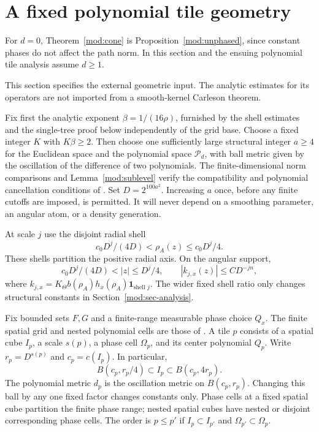 \documentclass[11pt]{article}
\numberwithin{equation}{section}
\theoremstyle{remark}
\theoremstyle{definition}
\newcommand{\PP}{\mathcal P}
\begin{document}
\section{A fixed polynomial tile geometry}\label{mod:sec-geometry}
For $d=0$, Theorem~\ref{mod:cone} is Proposition~\ref{mod:unphased}, since constant phases do not affect the path norm. In this section and the ensuing polynomial tile analysis assume $d\ge1$.

This section specifies the external geometric input. The analytic
estimates for its operators are not imported from a smooth-kernel
Carleson theorem.

Fix first the analytic exponent $\beta=1/(16\rho)$, furnished by
the shell estimates and the single-tree proof below independently of
the grid base. Choose a fixed integer $K$ with $K\beta\ge2$.
Then choose one sufficiently large structural integer $a\ge4$ for the
Euclidean space and the polynomial space $\PP_d$, with ball metric given
by the oscillation of the difference of two polynomials. The
finite-dimensional norm comparisons and Lemma~\ref{mod:sublevel} verify
the compatibility and polynomial cancellation conditions of
\cite{BDJST}. Set $D=2^{100a^2}$. Increasing $a$ once, before any finite
cutoffs are imposed, is permitted. It will never depend on a smoothing
parameter, an angular atom, or a density generation.

At scale $j$ use the disjoint radial shell
\begin{equation}\label{mod:raw-shell}
 c_0D^j/(4D)<\rho_A(z)\le c_0D^j/4.
\end{equation}
These shells partition the positive radial axis. On the angular support,
\[
 c_0D^j/(4D)<|z|\le D^j/4,
 \qquad |k_{j,x}(z)|\le C D^{-jn},
\]
where $k_{j,x}=K_\Theta b(\rho_A)h_x(\rho_A)\mathbf1_{\text{shell }j}$.
The wider fixed shell ratio only changes structural constants in
Section~\ref{mod:sec-analysis}.

Fix bounded sets $F,G$ and a finite-range measurable phase choice $Q_x$.
The finite spatial grid and nested polynomial cells are those of
\cite[Proposition 2.1]{BDJST}. A tile $p$ consists of a spatial cube
$I_p$, a scale $s(p)$, a phase cell $\Omega_p$, and its center polynomial
$Q_p$. Write $r_p=D^{s(p)}$ and $c_p=c(I_p)$. In particular,
\[
 B(c_p,r_p/4)\subset I_p\subset B(c_p,4r_p).
\]
The polynomial metric $d_p$ is the oscillation metric on $B(c_p,r_p)$.
Changing this ball by any one fixed factor changes constants only.
Phase cells at a fixed spatial cube partition the finite phase range;
nested spatial cubes have nested or disjoint corresponding phase cells.
The order is $p\le p'$ if $I_p\subset I_{p'}$ and
$\Omega_{p'}\subset\Omega_p$.
\end{document}
